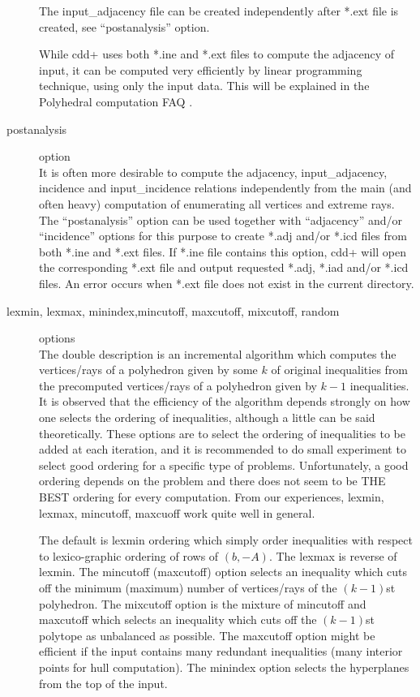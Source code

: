 \documentclass[11pt]{article}
\begin{document}
\begin{description}
The input\_adjacency file  can be created independently
after *.ext file is created, see ``postanalysis'' option.

While cdd+ uses both *.ine and *.ext files to compute the adjacency
of input,  it can be computed very efficiently by linear programming technique, 
using only the input data.   This will be explained in
the Polyhedral computation FAQ \cite{f-pcfaq-97}.

\item[postanalysis] option\\
It is often more desirable to compute the adjacency, 
input\_adjacency, incidence and input\_incidence relations
independently from the main (and often heavy) computation of enumerating all vertices
and extreme rays.  The ``postanalysis'' option can be used together
with ``adjacency'' and/or ``incidence'' options for this purpose  
to create *.adj and/or *.icd files from both *.ine and *.ext files.
If *.ine file contains this option, cdd+ will open the
corresponding *.ext file and output requested *.adj, *.iad and/or *.icd files.
An error occurs when *.ext file does not exist in the current
directory.

\item[lexmin, lexmax, minindex,mincutoff, maxcutoff, mixcutoff, random] options\\
The double description is an incremental algorithm which
computes the vertices/rays of a polyhedron given by some $k$ of
original inequalities from the precomputed vertices/rays of a
polyhedron given by $k-1$ inequalities.  It is observed that
the efficiency of the algorithm depends strongly on how
one selects the ordering of inequalities, although a little
can be said theoretically.
These options are to select the ordering of inequalities to be
added at each iteration, and it is recommended to do small
experiment to select good ordering for a specific type of problems.
Unfortunately, a good ordering depends on the problem and there does not seem 
to be THE BEST ordering for every computation.  From our experiences,
lexmin, lexmax, mincutoff, maxcuoff work quite well in general.

The default is lexmin ordering which simply order inequalities
with respect to lexico-graphic ordering of rows of $(b, -A)$.  The lexmax
is reverse of lexmin.  The mincutoff (maxcutoff) option selects an inequality which
cuts off the minimum (maximum) number of vertices/rays of the $(k-1)$st polyhedron. 
The mixcutoff option is the mixture of mincutoff and maxcutoff which selects
an inequality which cuts off the $(k-1)$st polytope as unbalanced as possible.
The maxcutoff option might be efficient if the input contains
many redundant inequalities (many interior points for hull computation).
The minindex option selects the hyperplanes from the top of
the input.


\end{description}
\end{document}

